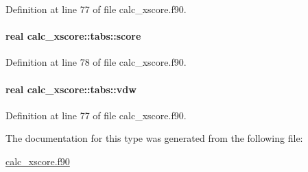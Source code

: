 Definition at line 77 of file calc\-\_\-xscore.\-f90.

\hypertarget{structcalc__xscore_1_1tabs_afcc90593c75b10127baf40177c3f478e}{
\paragraph[{score}]{\setlength{\rightskip}{0pt plus 5cm}real calc\-\_\-xscore\-::tabs\-::score}}\label{structcalc__xscore_1_1tabs_afcc90593c75b10127baf40177c3f478e}


Definition at line 78 of file calc\-\_\-xscore.\-f90.

\hypertarget{structcalc__xscore_1_1tabs_a4780e50e91b0190aded463e7cd212125}{
\paragraph[{vdw}]{\setlength{\rightskip}{0pt plus 5cm}real calc\-\_\-xscore\-::tabs\-::vdw}}\label{structcalc__xscore_1_1tabs_a4780e50e91b0190aded463e7cd212125}


Definition at line 77 of file calc\-\_\-xscore.\-f90.



The documentation for this type was generated from the following file\-:\begin{DoxyCompactItemize}
\item 
\hyperlink{calc__xscore_8f90}{calc\-\_\-xscore.\-f90}\end{DoxyCompactItemize}
